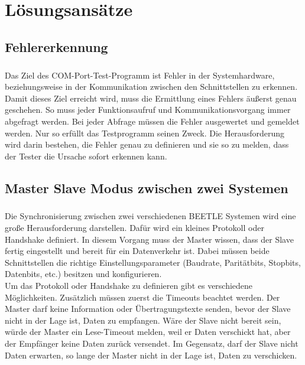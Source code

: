 \chapter{Lösungsansätze}\label{chp:loesungsansaetze}

\section{Fehlererkennung}
\paragraph{}
Das Ziel des COM-Port-Test-Programm ist Fehler in der Systemhardware, beziehungsweise in der Kommunikation zwischen den Schnittstellen zu erkennen. Damit dieses Ziel erreicht wird, muss die Ermittlung eines Fehlers äußerst genau geschehen. So muss jeder Funktionsaufruf und Kommunikationsvorgang immer abgefragt werden. Bei jeder Abfrage müssen die Fehler ausgewertet und gemeldet werden. Nur so erfüllt das Testprogramm seinen Zweck. Die Herausforderung wird darin bestehen, die Fehler genau zu definieren und sie so zu melden, dass der Tester die Ursache sofort erkennen kann.

\section{Master Slave Modus zwischen zwei Systemen}
\paragraph{}
Die Synchronisierung zwischen zwei verschiedenen BEETLE Systemen wird eine große Herausforderung darstellen. Dafür wird ein kleines Protokoll oder Handshake definiert. In diesem Vorgang muss der Master wissen, dass der Slave fertig eingestellt und bereit für ein Datenverkehr ist. Dabei müssen beide Schnittstellen die richtige Einstellungsparameter (Baudrate, Paritätbits, Stopbits, Datenbits, etc.) besitzen und konfigurieren.\\


Um das Protokoll oder Handshake zu definieren gibt es verschiedene Möglichkeiten. Zusätzlich müssen zuerst die Timeouts beachtet werden. Der Master darf keine Information oder Übertragungstexte senden, bevor der Slave nicht in der Lage ist, Daten zu empfangen. Wäre der Slave nicht bereit sein, würde der Master ein Lese-Timeout melden, weil er Daten verschickt hat, aber der Empfänger keine Daten zurück versendet. Im Gegensatz, darf der Slave nicht Daten erwarten, so lange der Master nicht in der Lage ist, Daten zu verschicken.\\


